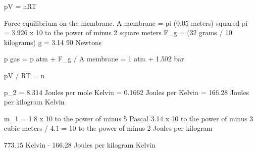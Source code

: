 pV = nRT

Force equilibrium on the membrane.  
A membrane = pi (0.05 meters) squared pi = 3.926 x 10 to the power of minus 2 square meters  
F_g = (32 grams / 10 kilograms) g = 3.14 90 Newtons  

p gas = p atm + F_g / A membrane = 1 atm + 1.502 bar  

pV / RT = n  

p_2 = 8.314 Joules per mole Kelvin = 0.1662 Joules per Kelvin = 166.28 Joules per kilogram Kelvin  

m_1 = 1.8 x 10 to the power of minus 5 Pascal 3.14 x 10 to the power of minus 3 cubic meters / 4.1 = 10 to the power of minus 2 Joules per kilogram  

773.15 Kelvin - 166.28 Joules per kilogram Kelvin